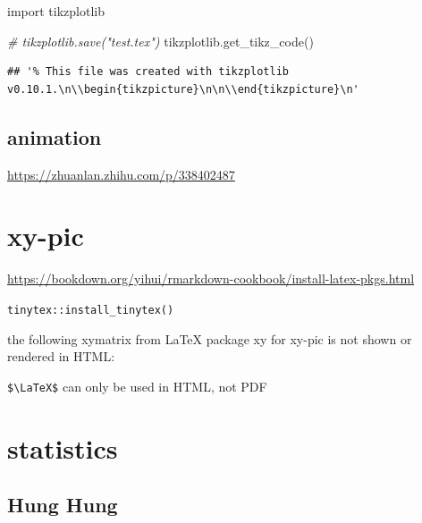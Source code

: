 \documentclass[
]{book}
\newenvironment{Shaded}{\begin{snugshade}}{\end{snugshade}}
\newcommand{\CommentTok}[1]{\textcolor[rgb]{0.56,0.35,0.01}{\textit{#1}}}
\newcommand{\ImportTok}[1]{#1}
\newcommand{\NormalTok}[1]{#1}
\theoremstyle{definition}
\theoremstyle{definition}
\theoremstyle{definition}
\theoremstyle{definition}
\theoremstyle{remark}
\begin{document}
\begin{Shaded}
\begin{Highlighting}[]
\ImportTok{import}\NormalTok{ tikzplotlib}

\CommentTok{\# tikzplotlib.save("test.tex")}
\NormalTok{tikzplotlib.get\_tikz\_code()}
\end{Highlighting}
\end{Shaded}

\begin{verbatim}
## '% This file was created with tikzplotlib v0.10.1.\n\\begin{tikzpicture}\n\n\\end{tikzpicture}\n'
\end{verbatim}

\hypertarget{animation}{%
\section{animation}\label{animation}}

\url{https://zhuanlan.zhihu.com/p/338402487}

\hypertarget{xy-pic}{%
\chapter{xy-pic}\label{xy-pic}}

\url{https://bookdown.org/yihui/rmarkdown-cookbook/install-latex-pkgs.html}

\texttt{tinytex::install\_tinytex()}

the following xymatrix from LaTeX package xy for xy-pic is not shown or rendered in HTML:

\texttt{\$\textbackslash{}LaTeX\$} can only be used in HTML, not PDF


\hypertarget{statistics}{%
\chapter{statistics}\label{statistics}}

\hypertarget{hung-hung}{%
\section{Hung Hung}\label{hung-hung}}
\end{document}

